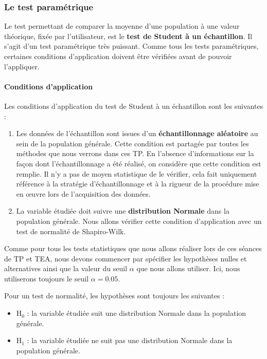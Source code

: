 \documentclass[
  a4paper,
]{article}
\providecommand{\tightlist}{%
  \setlength{\itemsep}{0pt}\setlength{\parskip}{0pt}}
\begin{document}
\hypertarget{le-test-paramuxe9trique}{%
\subsubsection{Le test paramétrique}\label{le-test-paramuxe9trique}}

Le test permettant de comparer la moyenne d'une population à une valeur théorique, fixée par l'utilisateur, est le \textbf{test de Student à un échantillon}. Il s'agit d'un test paramétrique très puissant. Comme tous les tests paramétriques, certaines conditions d'application doivent être vérifiées avant de pouvoir l'appliquer.

\hypertarget{conditions-dapplication}{%
\paragraph{Conditions d'application}\label{conditions-dapplication}}

Les conditions d'application du test de Student à un échantillon sont les suivantes :

\begin{enumerate}
\def\labelenumi{\arabic{enumi}.}
\tightlist
\item
  Les données de l'échantillon sont issues d'un \textbf{échantillonnage aléatoire} au sein de la population générale. Cette condition est partagée par toutes les méthodes que nous verrons dans ces TP. En l'absence d'informations sur la façon dont l'échantillonnage a été réalisé, on considère que cette condition est remplie. Il n'y a pas de moyen statistique de le vérifier, cela fait uniquement référence à la stratégie d'échantillonnage et à la rigueur de la procédure mise en œuvre lors de l'acquisition des données.
\item
  La variable étudiée doit suivre une \textbf{distribution Normale} dans la population générale. Nous allons vérifier cette condition d'application avec un test de normalité de Shapiro-Wilk.
\end{enumerate}

Comme pour tous les tests statistiques que nous allons réaliser lors de ces séances de TP et TEA, nous devons commencer par spécifier les hypothèses nulles et alternatives ainsi que la valeur du seuil \(\alpha\) que nous allons utiliser. Ici, nous utiliserons toujours le seuil \(\alpha = 0.05\).

Pour un test de normalité, les hypothèses sont toujours les suivantes :

\begin{itemize}
\tightlist
\item
  H\(_0\) : la variable étudiée suit une distribution Normale dans la population générale.
\item
  H\(_1\) : la variable étudiée ne suit pas une distribution Normale dans la population générale.
\end{itemize}
\end{document}

